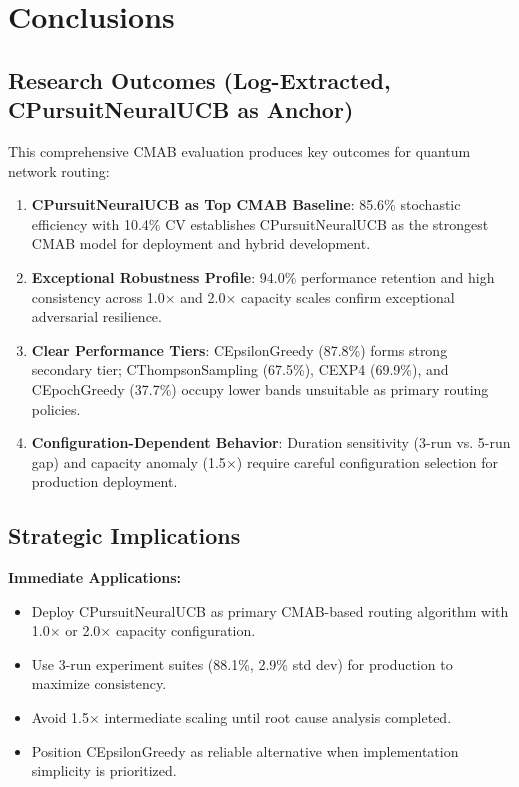 \documentclass[12pt,a4paper]{article}
\newcommand{\primarytext}[1]{\textcolor{primaryblue}{\textbf{#1}}}
\newcommand{\secondarytext}[1]{\textcolor{secondaryblue}{\textbf{#1}}}
\newcommand{\success}[1]{\textcolor{accentgreen}{\textbf{#1}}}
\newcommand{\warning}[1]{\textcolor{warningred}{\textbf{#1}}}
\begin{document}
\newpage
\section{Conclusions}

\subsection{Research Outcomes (Log-Extracted, CPursuitNeuralUCB as Anchor)}

This comprehensive CMAB evaluation produces key outcomes for quantum network routing:

\begin{enumerate}
    \item \primarytext{CPursuitNeuralUCB as Top CMAB Baseline}: 85.6\% stochastic efficiency with 10.4\% CV establishes CPursuitNeuralUCB as the strongest CMAB model for deployment and hybrid development.
    
    \item \success{Exceptional Robustness Profile}: 94.0\% performance retention and high consistency across 1.0$\times$ and 2.0$\times$ capacity scales confirm exceptional adversarial resilience.
    
    \item \secondarytext{Clear Performance Tiers}: CEpsilonGreedy (87.8\%) forms strong secondary tier; CThompsonSampling (67.5\%), CEXP4 (69.9\%), and CEpochGreedy (37.7\%) occupy lower bands unsuitable as primary routing policies.
    
    \item \warning{Configuration-Dependent Behavior}: Duration sensitivity (3-run vs. 5-run gap) and capacity anomaly (1.5$\times$) require careful configuration selection for production deployment.
\end{enumerate}

\subsection{Strategic Implications}

\textbf{Immediate Applications:}
\begin{itemize}
    \item Deploy CPursuitNeuralUCB as primary CMAB-based routing algorithm with 1.0$\times$ or 2.0$\times$ capacity configuration.
    \item Use 3-run experiment suites (88.1\%, 2.9\% std dev) for production to maximize consistency.
    \item Avoid 1.5$\times$ intermediate scaling until root cause analysis completed.
    \item Position CEpsilonGreedy as reliable alternative when implementation simplicity is prioritized.
\end{itemize}
\end{document}
